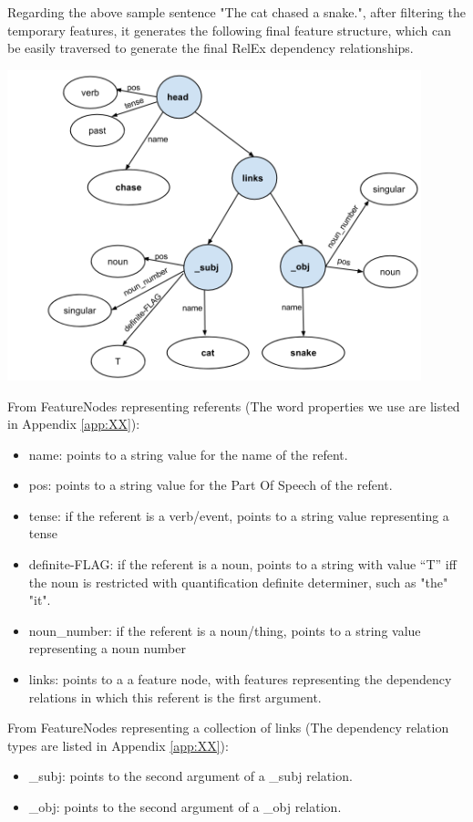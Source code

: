 Regarding the above sample sentence "The cat chased a snake.", after filtering the temporary features, it generates the following final feature structure, which can be easily traversed to generate the final RelEx dependency relationships.

\includegraphics[width=12cm]{figures/finalFeatureStructure.png}

\noindent From FeatureNodes representing referents (The word properties we use are listed in Appendix \ref{app:XX}):
\begin{itemize}
\item name: points to a string value for the name of the refent.
\item pos: points to a string value for the Part Of Speech of the refent.
\item tense: if the referent is a verb/event, points to a string value representing a tense
\item definite-FLAG: if the referent is a noun, points to a string with value ``T'' iff the noun is restricted with quantification definite determiner, such as "the" "it".
\item noun\_number: if the referent is a noun/thing, points to a string value representing a noun number
\item links: points to a a feature node, with features representing the dependency relations in which this referent is the first argument.
\end{itemize}

\noindent From FeatureNodes representing a collection of links (The dependency relation types are listed in Appendix \ref{app:XX}):
\begin{itemize}
\item \_subj: points to the second argument of a \_subj relation. 
\item \_obj: points to the second argument of a \_obj relation.
\end{itemize}

